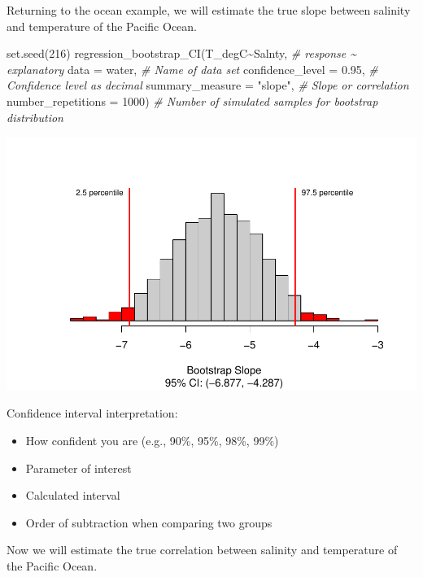 \documentclass[
]{report}
\newenvironment{Shaded}{\begin{snugshade}}{\end{snugshade}}
\newcommand{\AttributeTok}[1]{\textcolor[rgb]{0.77,0.63,0.00}{#1}}
\newcommand{\CommentTok}[1]{\textcolor[rgb]{0.56,0.35,0.01}{\textit{#1}}}
\newcommand{\DecValTok}[1]{\textcolor[rgb]{0.00,0.00,0.81}{#1}}
\newcommand{\FloatTok}[1]{\textcolor[rgb]{0.00,0.00,0.81}{#1}}
\newcommand{\FunctionTok}[1]{\textcolor[rgb]{0.00,0.00,0.00}{#1}}
\newcommand{\NormalTok}[1]{#1}
\newcommand{\SpecialCharTok}[1]{\textcolor[rgb]{0.00,0.00,0.00}{#1}}
\newcommand{\StringTok}[1]{\textcolor[rgb]{0.31,0.60,0.02}{#1}}
\begin{document}
Returning to the ocean example, we will estimate the true slope between salinity and temperature of the Pacific Ocean.

\begin{Shaded}
\begin{Highlighting}[]
\FunctionTok{set.seed}\NormalTok{(}\DecValTok{216}\NormalTok{)}
\FunctionTok{regression\_bootstrap\_CI}\NormalTok{(T\_degC}\SpecialCharTok{\textasciitilde{}}\NormalTok{Salnty, }\CommentTok{\# response \textasciitilde{} explanatory}
   \AttributeTok{data =}\NormalTok{ water, }\CommentTok{\# Name of data set}
   \AttributeTok{confidence\_level =} \FloatTok{0.95}\NormalTok{, }\CommentTok{\# Confidence level as decimal}
   \AttributeTok{summary\_measure =} \StringTok{"slope"}\NormalTok{, }\CommentTok{\# Slope or correlation}
   \AttributeTok{number\_repetitions =} \DecValTok{1000}\NormalTok{) }\CommentTok{\# Number of simulated samples for bootstrap distribution}
\end{Highlighting}
\end{Shaded}

\begin{center}\includegraphics[width=0.7\linewidth]{13-LN013-regression_files/figure-latex/unnamed-chunk-14-1} \end{center}

Confidence interval interpretation:

\begin{itemize}
\item
  How confident you are (e.g., 90\%, 95\%, 98\%, 99\%)
\item
  Parameter of interest
\item
  Calculated interval
\item
  Order of subtraction when comparing two groups
\end{itemize}

\vspace{0.8in}

Now we will estimate the true correlation between salinity and temperature of the Pacific Ocean.
\end{document}
